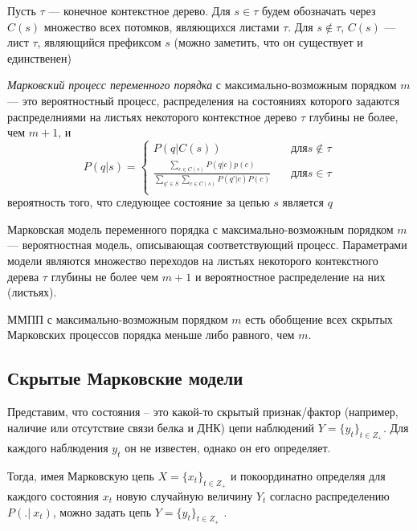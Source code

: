 \documentclass{matmex-diploma-custom}
\begin{document}
Пусть $\tau$ --- конечное контекстное дерево.
Для $s \in \tau$ будем обозначать через $ C(s) $ множество всех потомков, являющихся листами $\tau$. 
Для $s \notin \tau$, $C(s)$ --- лист $\tau$, являющийся префиксом  $s$ (можно заметить, что он существует и единственен)
\begin{definition}
\textit{Марковский процесс переменного порядка} с максимально-возможным порядком $m$ --- это вероятностный процесс, распределения на состояниях которого задаются распределниями на листьях некоторого контекстное дерево $\tau$ глубины не более, чем $m+1$, и 
\[ P(q |s) =
  \begin{cases}
    P(q|C(s))       & \quad \text{для} s \notin \tau\\
    \frac{\sum_{c \in C(s)} {P(q|c)p(c)}}{\sum_{q' \in S}\sum_{c \in C(s)} {P(q'|c)P(c)}} & \quad \text{для} s \in \tau\\
  \end{cases}
\]
вероятность того, что следующее состояние за цепью $s$ является $q$
\label{def:c_trie}
\end{definition}

\begin{definition}
Марковская модель переменного порядка с максимально-возможным порядком $m$ --- вероятностная модель, описывающая соответствующий процесс.
Параметрами модели являются множество переходов на листьях некоторого контекстного дерева $\tau$ глубины не более чем $m+1$ и вероятностное распределение на них (листьях).
\end{definition}

\begin{remark}
ММПП с максимально-возможным порядком $m$ есть обобщение всех скрытых Марковских процессов порядка меньше либо равного, чем $ m $.
\end{remark}

\subsection{Скрытые Марковские модели}
Представим, что состояния -- это какой-то скрытый признак/фактор (например, наличие или отсутствие связи белка и ДНК) цепи наблюдений $Y = \{y_{t}\}_{t \in Z_{+}}$. Для каждого наблюдения $y_{t}$ он не известен, однако он его определяет.


Тогда, имея Марковскую цепь $X = \{x_{t}\}_{t \in Z_{+}}$ и покоординатно определяя для каждого состояния $x_{t}$ новую случайную величину $Y_{t}$ согласно распределению $P(.|~x_{t})$, можно задать цепь
$Y = \{y_{t}\}_{t \in Z_{+}}$ .
\end{document}
